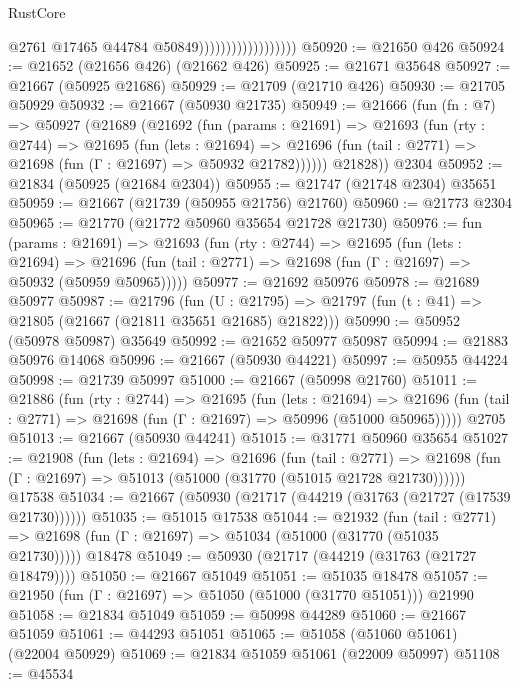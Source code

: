 \begin{lexlean}{RustCore}
\begin{coremodule}
                                        @2761
                                        @17465
                                        @44784
                                        @50849))))))))))))))))))
@50920 := @21650 @426
@50924 := @21652 (@21656 @426) (@21662 @426)
@50925 := @21671 @35648
@50927 := @21667 (@50925 @21686)
@50929 := @21709 (@21710 @426)
@50930 := @21705 @50929
@50932 := @21667 (@50930 @21735)
@50949 := @21666
    (fun (fn : @7) =>
    @50927
      (@21689
        (@21692
          (fun (params : @21691) =>
          @21693
            (fun (rty : @2744) =>
            @21695
              (fun (lets : @21694) =>
              @21696 (fun (tail : @2771) => @21698 (fun (Γ : @21697) => @50932 @21782))))))
        @21828))
    @2304
@50952 := @21834 (@50925 (@21684 @2304))
@50955 := @21747 (@21748 @2304) @35651
@50959 := @21667 (@21739 (@50955 @21756) @21760)
@50960 := @21773 @2304
@50965 := @21770 (@21772 @50960 @35654 @21728 @21730)
@50976 := fun (params : @21691) =>
  @21693
    (fun (rty : @2744) =>
    @21695
      (fun (lets : @21694) =>
      @21696 (fun (tail : @2771) => @21698 (fun (Γ : @21697) => @50932 (@50959 @50965)))))
@50977 := @21692 @50976
@50978 := @21689 @50977
@50987 := @21796
    (fun (U : @21795) => @21797 (fun (t : @41) => @21805 (@21667 (@21811 @35651 @21685) @21822)))
@50990 := @50952 (@50978 @50987) @35649
@50992 := @21652 @50977 @50987
@50994 := @21883 @50976 @14068
@50996 := @21667 (@50930 @44221)
@50997 := @50955 @44224
@50998 := @21739 @50997
@51000 := @21667 (@50998 @21760)
@51011 := @21886
    (fun (rty : @2744) =>
    @21695
      (fun (lets : @21694) =>
      @21696 (fun (tail : @2771) => @21698 (fun (Γ : @21697) => @50996 (@51000 @50965)))))
    @2705
@51013 := @21667 (@50930 @44241)
@51015 := @31771 @50960 @35654
@51027 := @21908
    (fun (lets : @21694) =>
    @21696
      (fun (tail : @2771) =>
      @21698 (fun (Γ : @21697) => @51013 (@51000 (@31770 (@51015 @21728 @21730))))))
    @17538
@51034 := @21667 (@50930 (@21717 (@44219 (@31763 (@21727 (@17539 @21730))))))
@51035 := @51015 @17538
@51044 := @21932
    (fun (tail : @2771) => @21698 (fun (Γ : @21697) => @51034 (@51000 (@31770 (@51035 @21730)))))
    @18478
@51049 := @50930 (@21717 (@44219 (@31763 (@21727 @18479))))
@51050 := @21667 @51049
@51051 := @51035 @18478
@51057 := @21950 (fun (Γ : @21697) => @51050 (@51000 (@31770 @51051))) @21990
@51058 := @21834 @51049
@51059 := @50998 @44289
@51060 := @21667 @51059
@51061 := @44293 @51051
@51065 := @51058 (@51060 @51061) (@22004 @50929)
@51069 := @21834 @51059 @51061 (@22009 @50997)
@51108 := @45534

\end{coremodule}
\end{lexlean}
